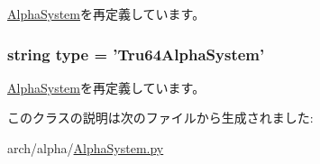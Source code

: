 \hyperlink{classAlphaSystem_1_1AlphaSystem_af401252d15d9cecde29d1fdcbaba250d}{AlphaSystem}を再定義しています。\hypertarget{classAlphaSystem_1_1Tru64AlphaSystem_acce15679d830831b0bbe8ebc2a60b2ca}{
\subsubsection[{type}]{\setlength{\rightskip}{0pt plus 5cm}string type = '{\bf Tru64AlphaSystem}'}}
\label{classAlphaSystem_1_1Tru64AlphaSystem_acce15679d830831b0bbe8ebc2a60b2ca}


\hyperlink{classAlphaSystem_1_1AlphaSystem_acce15679d830831b0bbe8ebc2a60b2ca}{AlphaSystem}を再定義しています。

このクラスの説明は次のファイルから生成されました:\begin{DoxyCompactItemize}
\item 
arch/alpha/\hyperlink{AlphaSystem_8py}{AlphaSystem.py}\end{DoxyCompactItemize}
